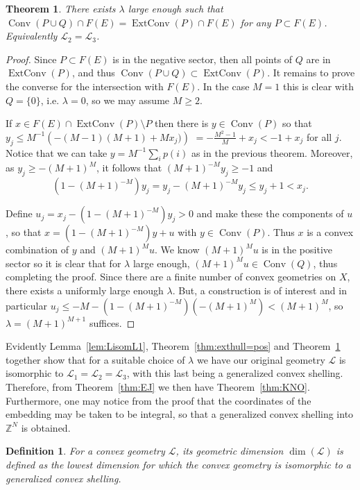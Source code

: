 \documentclass[12pt]{elsarticle}
\theoremstyle{plain}
\newtheorem{theorem}{Theorem}
\newtheorem{definition}{Definition}
\theoremstyle{definition}
\newcommand{\cgeom}{\mathcal{L}}
\DeclareMathOperator{\ExtHull}{ExtConv}
\DeclareMathOperator{\Hull}{Conv}
\begin{document}
\begin{theorem}\label{thm:hullshadow=pos}
There exists $\lambda$ large enough such that $\Hull(P\cup Q)\cap F(E)=\ExtHull(P)\cap F(E)$ for any $P\subset F(E)$. Equivalently $\cgeom_{2}=\cgeom_{3}$.
\end{theorem}
\begin{proof}
Since $P\subset F(E)$ is in the negative sector, then all points of $Q$ are in $\ExtHull(P)$, and thus $\Hull(P\cup Q)\subset\ExtHull(P)$. It remains to prove the converse for the intersection with $F(E)$.  In  the case $M=1$ this is clear with $Q=\{0\}$, i.e. $\lambda=0$, so we may assume $M\geq2$.

If $x\in F(E)\cap\ExtHull(P)\setminus P$ then there is $y\in\Hull(P)$ so that $y_j \leq M^{-1}\left(-(M-1)(M+1)+Mx_j)\right)$ $= -\frac{M^2-1}{M} + x_j < -1 + x_j$ for all $j$. Notice that we can take $y = M^{-1} \sum_i p(i)$ as in the previous theorem. Moreover, as $y_j \geq -(M+1)^M$, it follows that $(M+1)^{-M} y_j \geq -1$ and
\begin{equation*}
	(1-(M+1)^{-M})y_j = y_j - (M+1)^{-M} y_j \leq y_j + 1 < x_j.
\end{equation*}

Define $u_{j}=x_{j}-(1-(M+1)^{-M})y_{j}> 0$ and make these the components of $u$, so that \linebreak $x=(1-(M+1)^{-M})y+u$ with $y\in\Hull(P)$.  Thus $x$ is a convex combination of $y$ and $(M+1)^{M}u$.  We know $(M+1)^{M}u$ is in the positive sector so it is clear that for $\lambda$ large enough, $(M+1)^{M}u\in\Hull(Q)$, thus completing the proof. Since there are a finite number of convex geometries on $X$, there exists a uniformly large enough $\lambda$. But, a construction is of interest and in particular $u_{j}\leq -M -(1-(M+1)^{-M})(-(M+1)^{M})< (M+1)^{M}$, so $\lambda=(M+1)^{M+1}$ suffices.
\end{proof}

Evidently Lemma~\ref{lem:LisomL1}, Theorem~\ref{thm:exthull=pos} and Theorem~\ref{thm:hullshadow=pos} together show that for a suitable choice of $\lambda$ we have our original geometry $\cgeom$ is isomorphic to $\cgeom_{1}=\cgeom_{2}=\cgeom_{3}$, with this last being a generalized convex shelling.  Therefore, from Theorem~\ref{thm:EJ} we then have Theorem~\ref{thm:KNO}. Furthermore, one may notice from the proof that the coordinates of the embedding may be taken to be integral, so that a generalized convex shelling into $\mathbb{Z}^N$ is obtained.


\begin{definition} For a convex geometry $\cgeom$, its geometric dimension $\dim(\cgeom)$ is defined as the lowest dimension for which the convex geometry is isomorphic to a generalized convex shelling.
\end{definition}
\end{document}
